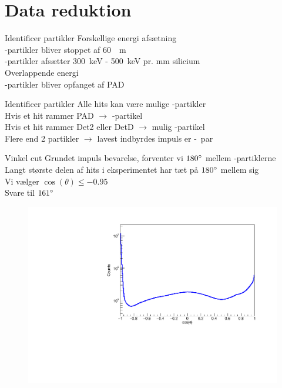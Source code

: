 \section{Data reduktion}

\begin{frame}{Identificer partikler}
	Forskellige energi afsætning\\
	\al-partikler bliver stoppet af \SI{60}{\mu m}\\
	\be-partikler afsætter \SI{300}{keV} - \SI{500}{keV} pr. mm silicium\\
	Overlappende energi\\
	\be-partikler bliver opfanget af PAD
\end{frame}

\begin{frame}{Identificer partikler}
	Alle hits kan være mulige \al-partikler\\ 
	Hvis et hit rammer PAD $\rightarrow$ \be-partikel\\
	Hvis et hit rammer Det2 eller DetD $\rightarrow$ mulig \be-partikel\\
	Flere end 2 partikler $\rightarrow$ lavest indbyrdes impuls er \al-\al\ par
\end{frame}

\begin{frame}{Vinkel cut}
	Grundet impuls bevarelse, forventer vi $180 \degree $ mellem \al-partiklerne\\
	Langt største delen af hits i eksperimentet har tæt på $180 \degree$ mellem sig\\
	Vi vælger $\cos(\theta) \leq -0.95$\\
	Svare til $161\degree$
	\begin{figure}
		\centering
		\includegraphics[width=.7\columnwidth]{../figures/cosang.pdf}
	\end{figure}
\end{frame}

